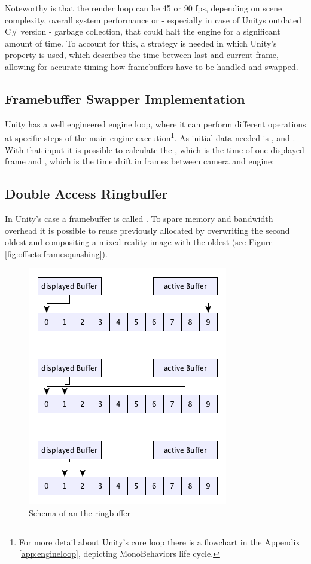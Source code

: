 Noteworthy is that the render loop can be 45 or 90 fps, depending on scene 
complexity, overall system performance or - especially in case of Unitys 
outdated C\# version - garbage collection, that could halt the engine for a 
significant amount of time. To account for this, a strategy is needed in which 
Unity's  property is used, which describes the time 
between last and current frame, allowing for accurate timing how framebuffers 
have to be handled and swapped.

\subsection{Framebuffer Swapper Implementation}

Unity has a well engineered engine loop, where it can perform different 
operations at specific steps of the main engine execution\footnote{For more 
detail about Unity's core loop there is a flowchart in the Appendix 
\ref{app:engineloop}, depicting MonoBehaviors life cycle.}. As 
initial data needed is ,  and 
. With that input it is possible to calculate the 
, which is the time of one displayed frame and 
, which is the time drift in frames between camera and engine:



\subsection{Double Access Ringbuffer}

In Unity's case a framebuffer is called . To spare 
memory and bandwidth overhead it is possible to reuse previously allocated 
 by overwriting the second oldest  and 
compositing a mixed reality image with the oldest (see  
Figure \ref{fig:offsets:framesquashing}).

\begin{figure}[ht]
	\centering
	\includegraphics[width=.5\textwidth]{gfx/ringbuffer_schematics.png}
	\caption{Schema of an the ringbuffer}
	\label{fig:offsets:ringbuffer}
\end{figure}

